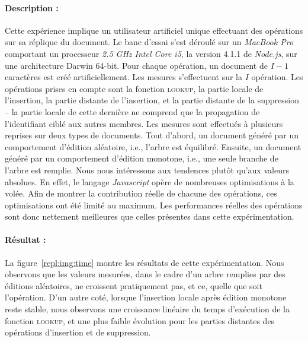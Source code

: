 \paragraph{Description :} Cette expérience implique un utilisateur artificiel
unique effectuant des opérations sur sa réplique du document. Le banc d'essai
s'est déroulé sur un \emph{MacBook Pro} comportant un processeur \emph{2.5 GHz
  Intel Core i5}, la version 4.1.1 de \emph{Node.js}, sur une architecture
Darwin 64-bit. Pour chaque opération, un document de $I-1$ caractères est créé
artificiellement. Les mesures s'effectuent sur la $I$ opération. Les
opérations prises en compte sont la fonction \textsc{lookup}, la partie locale
de l'insertion, la partie distante de l'insertion, et la partie distante de la
suppression -- la partie locale de cette dernière ne comprend que la propagation
de l'identifiant ciblé aux autres membres. Les mesures sont effectués à
plusieurs reprises sur deux types de documents. Tout d'abord, un document généré
par un comportement d'édition aléatoire, i.e., l'arbre \LSEQ est
équilibré. Ensuite, un document généré par un comportement d'édition monotone,
i.e., une seule branche de l'arbre \LSEQ est remplie. Nous nous intéressons aux
tendences plutôt qu'aux valeurs absolues. En effet, le langage \emph{Javascript}
opère de nombreuses optimisations à la volée. Afin de montrer la contribution
réelle de chacune des opérations, ces optimisations ont été limité au
maximum. Les performances réelles des opérations sont donc nettement meilleures
que celles présentes dans cette expérimentation.

\paragraph{Résultat :} La figure~\ref{repl:img:time} montre les résultats de
cette expérimentation. Nous observons que les valeurs mesurées, dans le cadre
d'un arbre remplies par des éditions aléatoires, ne croissent pratiquement pas,
et ce, quelle que soit l'opération. D'un autre coté, lorsque l'insertion locale
après édition monotone reste stable, nous observons une croissance linéaire du
temps d'exécution de la fonction \textsc{lookup}, et une plus faible évolution
pour les parties distantes des opérations d'insertion et de suppression.

